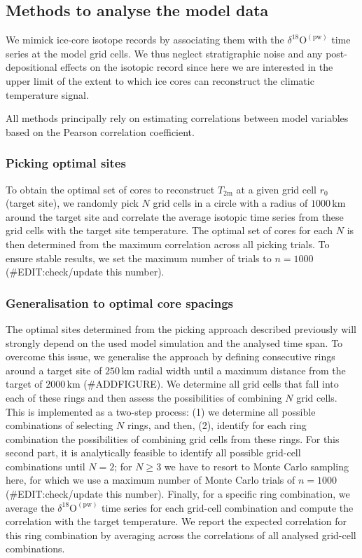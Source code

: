 \documentclass[cp, manuscript]{copernicus}
\begin{document}
\subsection{Methods to analyse the model data}\label{methods:main}

We mimick ice-core isotope records by associating them with the
$\delta^{18}\mathrm{O}^{\mathrm{(pw)}}$ time series at the model grid cells. We
thus neglect stratigraphic noise and any post-depositional effects on the
isotopic record since here we are interested in the upper limit of the extent to
which ice cores can reconstruct the climatic temperature signal.

All methods principally rely on estimating correlations between model variables
based on the Pearson correlation coefficient.

\subsubsection{Picking optimal sites}\label{methods:picking}

To obtain the optimal set of cores to reconstruct $T_{2\mathrm{m}}$
at a given grid cell $r_0$ (target site), we randomly pick $N$ grid cells
in a circle with a radius of $1000$\,km around the target site and correlate the
average isotopic time series from these grid cells with the target site
temperature. The optimal set of cores for each $N$ is then determined from the
maximum correlation across all picking trials. To ensure stable results, we set
the maximum number of trials to $n=1000$ (\#EDIT:check/update this number).

\subsubsection{Generalisation to optimal core spacings}\label{methods:general}

The optimal sites determined from the picking approach described previously will
strongly depend on the used model simulation and the analysed time span. To
overcome this issue, we generalise the approach by defining consecutive rings
around a target site of $250$\,km radial width until a maximum distance from the
target of $2000$\,km (\#ADDFIGURE). We determine all grid cells that fall into
each of these rings and then assess the possibilities of combining $N$ grid
cells. This is implemented as a two-step process: (1) we determine all possible
combinations of selecting $N$ rings, and then, (2), identify for each ring
combination the possibilities of combining grid cells from these rings. For this
second part, it is analytically feasible to identify all possible grid-cell
combinations until $N=2$; for $N\geq3$ we have to resort to Monte Carlo sampling
here, for which we use a maximum number of Monte Carlo trials of $n=1000$
(\#EDIT:check/update this number). Finally, for a specific ring combination, we
average the $\delta^{18}\mathrm{O}^{\mathrm{(pw)}}$ time series for each
grid-cell combination and compute the correlation with the target temperature.
We report the expected correlation for this ring combination by averaging across
the correlations of all analysed grid-cell combinations.
\end{document}
